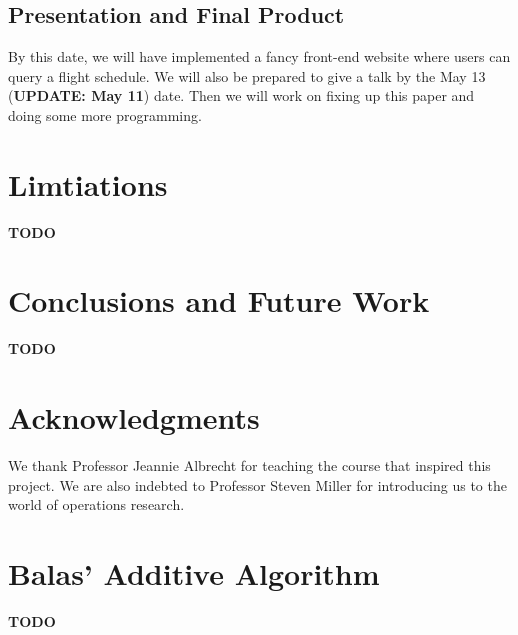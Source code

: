 \documentclass{article}
\begin{document}
\subsection{Presentation and Final Product}

By this date, we will have implemented a fancy front-end website where users can query a flight schedule. We will also be prepared to give a talk by
the May 13 ({\bf UPDATE: May 11}) date. Then we will work on fixing up this paper and doing some more programming.

\section{Limtiations}\label{sec:limitations}

{\bf TODO}

\section{Conclusions and Future Work}\label{sec:conclusions}

{\bf TODO}

\section*{Acknowledgments}
 
We thank Professor Jeannie Albrecht for teaching the course that inspired this project. We are also indebted to Professor Steven Miller for
introducing us to the world of operations research.





\onecolumn

\appendix
\section{Balas' Additive Algorithm}

{\bf TODO}
\end{document}
